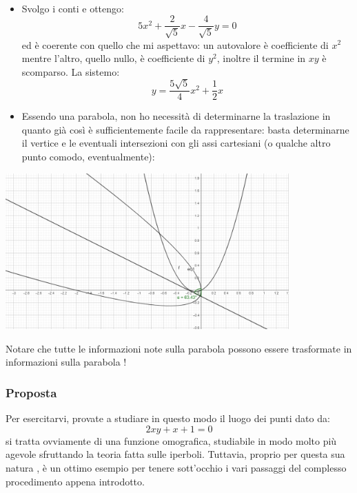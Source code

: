 \documentclass[a4paper, oneside]{article}
\begin{document}
\begin{itemize}
\begin{align*}
				\end{align*}
				\item Svolgo i conti e ottengo:
				\begin{equation*}
					5x^2+\frac{2}{\sqrt{5}}x-\frac{4}{\sqrt{5}}y=0
				\end{equation*}
				ed è coerente con quello che mi aspettavo: un autovalore è coefficiente di $x^2$ mentre l'altro, quello nullo, è coefficiente di $y^2$, inoltre il termine in $xy$ è scomparso. La sistemo:
				\begin{equation*}
					y=\frac{5\sqrt{5}}{4}x^2+\frac{1}{2}x
				\end{equation*}
				\item Essendo una parabola, non ho necessità di determinarne la traslazione in quanto già così è sufficientemente facile da rappresentare: basta determinarne il vertice e le eventuali intersezioni con gli assi cartesiani (o qualche altro punto comodo, eventualmente):
			\end{itemize}
			\begin{center}
				\includegraphics[height=170pt]{Pics/Es1.png}
			\end{center}
			Notare che tutte le informazioni note sulla parabola  possono essere trasformate in informazioni sulla parabola !
			
		\subsubsection{Proposta}
			Per esercitarvi, provate a studiare in questo modo il luogo dei punti dato da:
			\begin{equation*}
				2xy+x+1=0
			\end{equation*}
			si tratta ovviamente di una funzione omografica, studiabile in modo molto più agevole sfruttando la teoria fatta sulle iperboli. Tuttavia, proprio per questa sua natura , è un ottimo esempio per tenere sott'occhio i vari passaggi del complesso procedimento appena introdotto.
		
\end{document}
